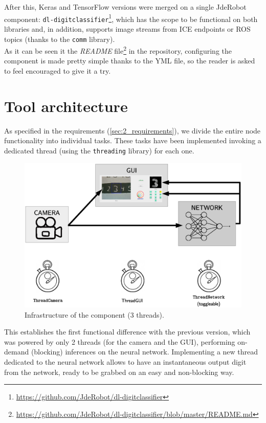 		After this, Keras and TensorFlow versions were merged on a single JdeRobot component: \texttt{dl-digitclassifier}\footnote{\url{https://github.com/JdeRobot/dl-digitclassifier}}, which has the scope to be functional on both libraries and, in addition, supports image streams from ICE endpoints or ROS topics (thanks to the \texttt{comm} library).\\
		
		As it can be seen it the \emph{README} file\footnote{\url{https://github.com/JdeRobot/dl-digitclassifier/blob/master/README.md}} in the repository, configuring the component is made pretty simple thanks to the YML file, so the reader is asked to feel encouraged to give it a try.\\
		
	\section{Tool architecture}
		As specified in the requirements (\autoref{sec:2_requirements}), we divide the entire node functionality into individual tasks. These tasks have been implemented invoking a dedicated thread (using the \texttt{threading} library) for each one.\\
		
		\begin{figure}[h]
			\centering
			\includegraphics[width=5in]{images/digitclassifier_infrastructure}
			\caption{Infrastructure of the component (3 threads).}
			\label{fig:4_digitclassifier_infrastructure}
		\end{figure}
		
		
		
		This establishes the first functional difference with the previous version, which was powered by only 2 threads (for the camera and the GUI), performing on-demand (blocking) inferences on the neural network. Implementing a new thread dedicated to the neural network allows to have an instantaneous output digit from the network, ready to be grabbed on an easy and non-blocking way.\\
		
